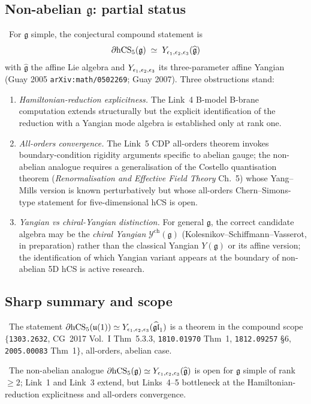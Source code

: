 \subsection{Non-abelian $\mathfrak g$: partial status}

\ClaimStatusConjectured\ For $\mathfrak g$ simple, the conjectural
compound statement is
\[
  \partial \mathrm{hCS}_5(\mathfrak g)
  \;\simeq\;
  Y_{\epsilon_1,\epsilon_2,\epsilon_3}(\widehat{\mathfrak g})
\]
with $\widehat{\mathfrak g}$ the affine Lie algebra and
$Y_{\epsilon_1,\epsilon_2,\epsilon_3}$ its three-parameter affine Yangian (Guay 2005
\texttt{arXiv:math/0502269}; Guay 2007). Three obstructions stand:

\begin{enumerate}
\item \emph{Hamiltonian-reduction explicitness.} The Link~4 B-model
  B-brane computation extends structurally but the explicit
  identification of the reduction with a Yangian mode algebra is
  established only at rank one.
\item \emph{All-orders convergence.} The Link~5 CDP all-orders
  theorem invokes boundary-condition rigidity arguments specific to
  abelian gauge; the non-abelian analogue requires a generalisation
  of the Costello quantisation theorem
  (\emph{Renormalisation and Effective Field Theory} Ch.~5) whose
  Yang--Mills version is known perturbatively but whose all-orders
  Chern--Simons-type statement for five-dimensional hCS is open.
\item \emph{Yangian vs chiral-Yangian distinction.} For general
  $\mathfrak g$, the correct candidate algebra may be the
  \emph{chiral Yangian} $\mathcal Y^{\mathrm{ch}}(\mathfrak g)$
  (Kolesnikov--Schiffmann--Vasserot, in preparation) rather than
  the classical Yangian $Y(\mathfrak g)$ or its affine version; the
  identification of which Yangian variant appears at the boundary
  of non-abelian 5D hCS is active research.
\end{enumerate}

\subsection{Sharp summary and scope}

\ClaimStatusTheorem\ The statement
$\partial \mathrm{hCS}_5(\mathfrak{u}(1)) \simeq Y_{\epsilon_1,\epsilon_2,\epsilon_3}(\widehat{\mathfrak{gl}}_1)$
is a theorem in the compound scope
$\{$\texttt{1303.2632}, CG~2017 Vol.~I Thm~5.3.3, \texttt{1810.01970}
Thm~1, \texttt{1812.09257} \S6, \texttt{2005.00083}
Thm~1$\}$, all-orders, abelian case.

\ClaimStatusConjectured\ The non-abelian analogue
$\partial \mathrm{hCS}_5(\mathfrak g) \simeq Y_{\epsilon_1,\epsilon_2,\epsilon_3}(\widehat{\mathfrak g})$
is open for $\mathfrak g$ simple of rank $\geq 2$; Link~1 and Link~3
extend, but Links~4--5 bottleneck at the Hamiltonian-reduction
explicitness and all-orders convergence.

